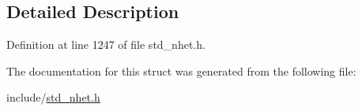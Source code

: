 \subsection{Detailed Description}


Definition at line 1247 of file std\+\_\+nhet.\+h.



The documentation for this struct was generated from the following file\+:\begin{DoxyCompactItemize}
\item 
include/\mbox{\hyperlink{std__nhet_8h}{std\+\_\+nhet.\+h}}\end{DoxyCompactItemize}
